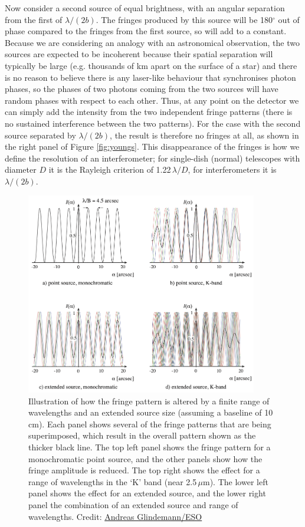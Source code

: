 \documentclass[11pt]{article}
\begin{document}
Now consider a second source of equal brightness, with an angular separation from the first of $\lambda/(2b)$. The fringes produced by this source will be 180$^\circ$ out of phase compared to the fringes from the first source, so will add to a constant. Because we are considering an analogy with an astronomical observation, the two sources are expected to be incoherent because their spatial separation will typically be large (e.g. thousands of km apart on the surface of a star) and there is no reason to believe there is any laser-like behaviour that synchronises photon phases, so the phases of two photons coming from the two sources will have random phases with respect to each other. Thus, at any point on the detector we can simply add the intensity from the two independent fringe patterns (there is no sustained interference between the two patterns). For the case with the second source separated by $\lambda/(2b)$, the result is therefore no fringes at all, as shown in the right panel of Figure \ref{fig:youngs}. This disappearance of the fringes is how we define the resolution of an interferometer; for single-dish (normal) telescopes with diameter $D$ it is the Rayleigh criterion of 1.22\,$\lambda/D$, for interferometers it is $\lambda/(2b)$.

\begin{figure}[h!]
    \centering
    \includegraphics[width=0.9\textwidth]{doc/coherence.png}
    \caption{Illustration of how the fringe pattern is altered by a finite range of wavelengths and an extended source size (assuming a baseline of 10\,cm). Each panel shows several of the fringe patterns that are being superimposed, which result in the overall pattern shown as the thicker black line. The top left panel shows the fringe pattern for a monochromatic point source, and the other panels show how the fringe amplitude is reduced. The top right shows the effect for a range of wavelengths in the `K' band (near 2.5\,$\mu$m). The lower left panel shows the effect for an extended source, and the lower right panel the combination of an extended source and range of wavelengths. Credit: \href{https://www.eso.org/sci/facilities/paranal/telescopes/vlti/tuto/tutorial_spatial_interferometry.pdf}{Andreas Glindemann/ESO}}
    \label{fig:coherence}
\end{figure}
\end{document}
